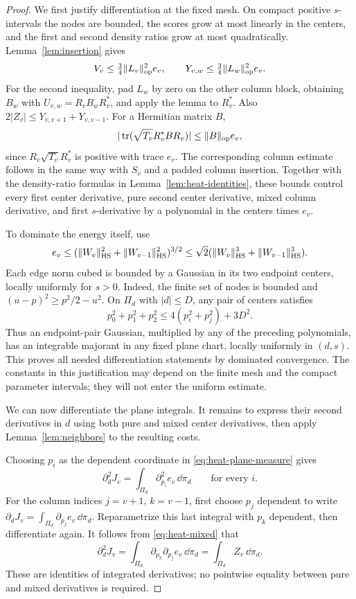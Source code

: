 \begin{proof}
We first justify differentiation at the fixed mesh.  On compact positive
$s$-intervals the nodes are bounded, the scores grow at most linearly in
the centers, and the first and second density ratios grow at most
quadratically.  Lemma~\ref{lem:insertion} gives
\[
 V_v\le\tfrac34\lVert L_v\rVert_{\mathrm{op}}^2e_v,
 \qquad Y_{v,w}\le\tfrac34\lVert L_w\rVert_{\mathrm{op}}^2e_v.
\]
For the second inequality, pad $L_w$ by zero on the other column block,
obtaining $B_w$ with $U_{v,w}=R_vB_wR_v^*$, and apply the lemma to
$R_v^*$.  Also $2|Z_v|\le Y_{v,v+1}+Y_{v,v-1}$.
For a Hermitian matrix $B$,
\[
 |\operatorname{tr}(\sqrt{T_v}R_v^*BR_v)|\le\lVert B\rVert_{\mathrm{op}}e_v,
\]
since $R_v\sqrt{T_v}R_v^*$ is positive with trace $e_v$.  The corresponding
column estimate follows in the same way with $S_v$ and a padded column
insertion.  Together with the density-ratio formulas in
Lemma~\ref{lem:heat-identities}, these bounds control every first center
derivative, pure second center derivative, mixed column derivative, and
first $s$-derivative by a polynomial in the centers times $e_v$.

To dominate the energy itself, use
\begin{equation}\label{eq:heat-energy-bound}
 e_v\le(\lVert W_v\rVert_{\mathrm{HS}}^2+
            \lVert W_{v-1}\rVert_{\mathrm{HS}}^2)^{3/2}
 \le\sqrt2(\lVert W_v\rVert_{\mathrm{HS}}^3+
                  \lVert W_{v-1}\rVert_{\mathrm{HS}}^3).
\end{equation}
Each edge norm cubed is bounded by a Gaussian in its two endpoint
centers, locally uniformly for $s>0$.  Indeed, the finite set of nodes is
bounded and $(u-p)^2\ge p^2/2-u^2$.  On $\Pi_d$ with $|d|\le D$, any
pair of centers satisfies
\[
 p_0^2+p_1^2+p_2^2\le4(p_i^2+p_j^2)+3D^2.
\]
Thus an endpoint-pair Gaussian, multiplied by any of the preceding
polynomials, has an integrable majorant in any fixed plane chart, locally
uniformly in $(d,s)$.  This proves all needed differentiation statements
by dominated convergence.  The constants in this justification may
depend on the finite mesh and the compact parameter intervals; they will
not enter the uniform estimate.

We can now differentiate the plane integrals. It remains to express
their second derivatives in $d$ using both pure and mixed center
derivatives, then apply Lemma~\ref{lem:neighbors} to the resulting costs.

Choosing $p_i$ as the dependent coordinate in
\eqref{eq:heat-plane-measure} gives
\[
 \partial_d^2J_v=\int_{\Pi_d}\partial_{p_i}^2e_v\,\dd\pi_d
 \qquad\text{for every }i.
\]
For the column indices $j=v+1$, $k=v-1$, first choose $p_j$ dependent to
write $\partial_dJ_v=\int_{\Pi_d}\partial_{p_j}e_v\,\dd\pi_d$.
Reparametrize this last integral with $p_k$ dependent, then differentiate
again.  It follows from \eqref{eq:heat-mixed} that
\begin{equation}\label{eq:heat-plane-mixed}
 \partial_d^2J_v
 =\int_{\Pi_d}\partial_{p_k}\partial_{p_j}e_v\,\dd\pi_d
 =\int_{\Pi_d}Z_v\,\dd\pi_d.
\end{equation}
These are identities of integrated derivatives; no pointwise equality
between pure and mixed derivatives is required.


\end{proof}
